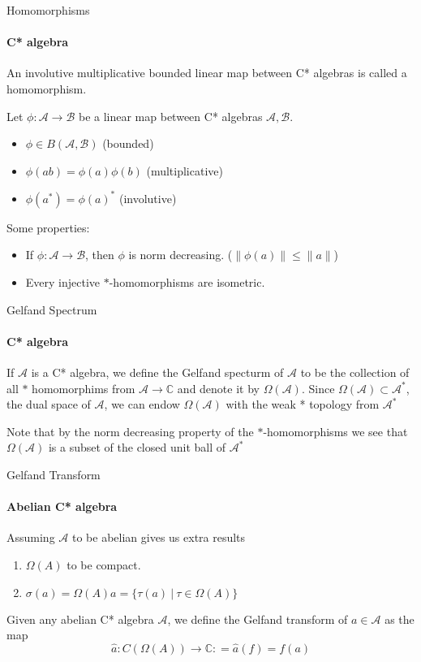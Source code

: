\documentclass[dvipsnames]{beamer}
\newcommand{\1}{\mathds{1}}	%
\begin{document}
\begin{frame}{Homomorphisms}
\framesubtitle{C* algebra}
\begin{definition}
  An involutive multiplicative bounded linear map between C* algebras is called a homomorphism. \pause

  Let $\phi: \mathcal{A \to B}$ be a linear map between C* algebras $\mathcal{A, B}$.
  \begin{itemize}
    \item $\phi \in B(\mathcal{A, B})$ (bounded)
    \item $\phi(ab) = \phi(a) \phi(b)$ (multiplicative)
    \item $\phi(a^*) = \phi(a)^*$ (involutive)
  \end{itemize}
\end{definition}
\pause

Some properties:
\begin{itemize} %
  \item If $\phi: \mathcal{A} \to \mathcal{B}$, then $\phi$ is norm decreasing. ($\|\phi(a)\| \le \|a\|$) \pause
  \item Every injective $*$-homomorphisms are isometric.
\end{itemize}
\end{frame}

\begin{frame}{Gelfand Spectrum}
\framesubtitle{C* algebra}
   \begin{definition}
     If $\mathcal{A}$ is a C* algebra, we define the Gelfand specturm of $\mathcal{A}$ to be the collection of all $*$ homomorphims from $\mathcal{A} \to \mathbb{C}$ and denote it by $\Omega(\mathcal{A})$. \pause
     Since $\Omega(\mathcal{A}) \subset \mathcal{A}^*$, the dual space of $\mathcal{A}$, we can endow $\Omega(\mathcal{A})$ with the weak * topology from $\mathcal{A}^*$
   \end{definition}
   \pause

   Note that by the norm decreasing property of the $*$-homomorphisms we see that $\Omega(\mathcal{A})$ is a subset of the closed unit ball of $\mathcal{A}^*$
\end{frame}

\begin{frame}{Gelfand Transform}
\framesubtitle{Abelian C* algebra}
  Assuming $\mathcal{A}$ to be abelian gives us extra results
  \begin{enumerate}
    \item $\Omega(A)$ to be compact. \pause
    \item $\sigma(a) = \Omega(A)a = \{\tau(a) \ | \ \tau \in \Omega(A) \}$
  \end{enumerate}
\pause

\begin{definition}
  Given any abelian C* algebra $\mathcal{A}$, we define the Gelfand transform of $a \in \mathcal{A}$ as the map $$\hat{a}: C(\Omega(A)) \to \mathbb{C}: = \hat{a}(f) = f(a)$$
\end{definition}
\end{frame}
\end{document}
